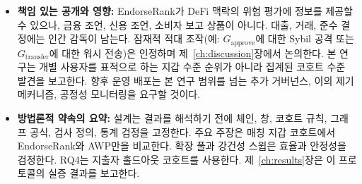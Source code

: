 \begin{itemize}
\item{}\label{sub:responsible-disclosure}
  \textbf{책임 있는 공개와 영향:} EndorseRank가 DeFi 맥락의 위험 평가에 정보를 제공할 수 있으나, 금융 조언, 신용 조언, 소비자 보고 상품이 아니다. 대출, 거래, 준수 결정에는 인간 감독이 남는다. 잠재적 적대 조작(예: $G_{\mathrm{approve}}$에 대한 Sybil 공격 또는 $G_{\mathrm{transfer}}$에 대한 워시 전송)은 인정하며 제~\ref{ch:discussion}장에서 논의한다. 본 연구는 개별 사용자를 표적으로 하는 지갑 수준 순위가 아니라 집계된 코호트 수준 발견을 보고한다. 향후 운영 배포는 본 연구 범위를 넘는 추가 거버넌스, 이의 제기 메커니즘, 공정성 모니터링을 요구할 것이다.


\item{}\label{sub:methodological-commitments}
  \textbf{방법론적 약속의 요약:} 설계는 결과를 해석하기 전에 체인, 창, 코호트 규칙, 그래프 공식, 검사 정의, 통계 검정을 고정한다. 주요 주장은 매칭 지갑 코호트에서 EndorseRank와 AWP만을 비교한다. 확장 풀과 강건성 스윕은 효율과 안정성을 검정한다. RQ4는 지출자 홀드아웃 코호트를 사용한다. 제~\ref{ch:results}장은 이 프로토콜의 실증 결과를 보고한다.
\end{itemize}
